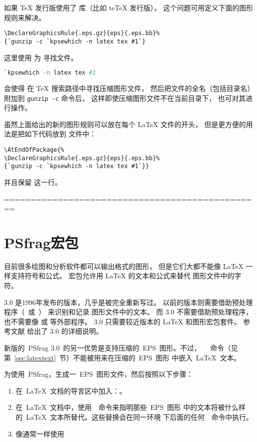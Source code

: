 如果 \TeX{} 发行版使用了  库（比如 te\TeX{} 发行版），
这个问题可用定义下面的图形规则来解决。
\begin{lstlisting}
\DeclareGraphicsRule{.eps.gz}{eps}{.eps.bb}%
{`gunzip -c `kpsewhich -n latex tex #1`}
\end{lstlisting}
这里使用  为  寻找文件。
\begin{lstlisting}[language=bash]
`kpsewhich -n latex tex #1
\end{lstlisting}
会使得  在 \TeX{} 搜索路径中寻找压缩图形文件，
然后把文件的全名（包括目录名）附加到 \texttt{gunzip -c} 命令后，
这样即使压缩图形文件不在当前目录下， 也可对其进行操作。

虽然上面给出的新的图形规则可以放在每个 \LaTeX{} 文件的开头，
但是更方便的用法是把如下代码放到  文件中：
\begin{lstlisting}
\AtEndOfPackage{%
\DeclareGraphicsRule{.eps.gz}{eps}{.eps.bb}%
{`gunzip -c `kpsewhich -n latex tex #1`}}
\end{lstlisting}
并且保留  这一行。

================================================
\section{PSfrag宏包}\label{sec:psfrag}

目前很多绘图和分析软件都可以输出格式的图形，
但是它们大都不能像 \LaTeX{} 一样支持符号和公式。
 宏包允许用 \LaTeX{} 的文本和公式来替代  图形文件中的字符。

 3.0 是1996年发布的版本，几乎是被完全重新写过。
以前的版本则需要借助预处理程序（~或~）
来识别和记录  图形文件中的文本。
而 3.0 不需要借助预处理程序，
也不需要像  或  等外部程序。
 3.0 只需要较近版本的 \LaTeX{} 和图形宏包套件。
参考文献 \cite{psfrag-doc} 给出了 3.0 的详细说明。






新版的~\textsf{PSfrag 3.0}~的另一优势是支持压缩的~EPS~图形。不过，
~~命令（见第~\ref{sec:latextext}~节）不能被用来在压缩的~EPS~图形
中嵌入~\LaTeX{}~文本。

为使用~\textsf{PSfrag}，生成一~EPS~图形文件，然后按照以下步骤：
\begin{enumerate}
\item 在~\LaTeX{}~文档的导言区中加入：。
\item 在~\LaTeX{}~文档中，使用~~命令来指明那些~EPS~图形
      中的文本将被什么样的~\LaTeX{}~文本所替代。这些替换会在同一环境
      下后面的任何~~命令中执行。
\item 像通常一样使用~
\end{enumerate}

